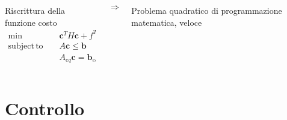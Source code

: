 \documentclass[]{beamer}
\DeclareMathOperator*{\subjectto}{subject\hspace{2pt}to}
\begin{document}
	\begin{frame}
		\centering 
		\begin{columns}
			\begin{column}{.45\textwidth}
				\centering
				Riscrittura della funzione costo
				\begin{alignat}{2}
					\min\qquad & \mathbf{c}^TH\mathbf{c} + f^T\mathbf{c} \nonumber \\
					\subjectto \qquad & A\mathbf{c} \le \mathbf{b} \nonumber \\
					& A_{eq}\mathbf{c} = \mathbf{b}_{eq} \nonumber
				\end{alignat}
			\end{column}
			\begin{column}{.1\textwidth}
				\centering
				\begin{equation*}
					\Rightarrow
				\end{equation*}
			\end{column}
			\begin{column}{.45\textwidth}
				\centering
				Problema quadratico di programmazione matematica, veloce
			\end{column}
		\end{columns}
		\begin{figure}
			
		\end{figure}
	\end{frame}

	
	\section{Controllo}
	
\end{document}
